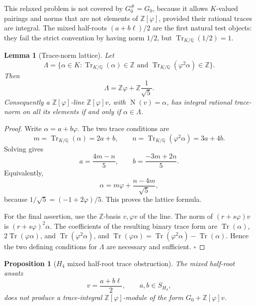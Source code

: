 \documentclass[12pt,oneside,english]{amsart}
\numberwithin{equation}{section}
\numberwithin{figure}{section}
\numberwithin{table}{section}
\theoremstyle{plain}
\newtheorem{proposition}[theorem]{Proposition}
\newtheorem{lemma}[theorem]{Lemma}
\theoremstyle{definition}
\theoremstyle{remark}
\newcommand{\ZZ}{\mathbb Z}
\newcommand{\QQ}{\mathbb Q}
\newcommand{\Zphi}{\mathbb Z[\varphi]}
\newcommand{\Tr}{\operatorname{Tr}}
\newcommand{\Norm}{\operatorname{N}}
\begin{document}
This relaxed problem is not covered by \(G_0^\#=G_0\), because it allows \(K\)-valued pairings and norms that are not elements of \(\Zphi\), provided their rational traces are integral. The mixed half-roots \((a+b\ell)/2\) are the first natural test objects: they fail the strict convention by having norm \(1/2\), but \(\Tr_{K/\QQ}(1/2)=1\).

\begin{lemma}[Trace-norm lattice]
Let
\begin{equation}
\Lambda=\{\alpha\in K:\Tr_{K/\QQ}(\alpha)\in\ZZ
\text{ and }\Tr_{K/\QQ}(\varphi^2\alpha)\in\ZZ\}.
\label{eq:trace-norm-lattice-definition}
\end{equation}
Then
\begin{equation}
\Lambda=\ZZ\varphi+\ZZ\frac{1}{\sqrt5}.
\label{eq:trace-norm-lattice}
\end{equation}
Consequently a \(\Zphi\)-line \(\Zphi v\), with \(\Norm(v)=\alpha\), has integral rational trace-norm on all its elements if and only if \(\alpha\in\Lambda\).
\end{lemma}

\begin{proof}
Write \(\alpha=a+b\varphi\). The two trace conditions are
\begin{equation}
m=\Tr_{K/\QQ}(\alpha)=2a+b,\qquad
n=\Tr_{K/\QQ}(\varphi^2\alpha)=3a+4b.
\label{eq:trace-norm-conditions}
\end{equation}
Solving gives
\begin{equation}
a=\frac{4m-n}{5},\qquad b=\frac{-3m+2n}{5}.
\label{eq:trace-norm-solution}
\end{equation}
Equivalently,
\begin{equation}
\alpha=m\varphi+\frac{n-4m}{\sqrt5},
\label{eq:trace-norm-generators}
\end{equation}
because \(1/\sqrt5=(-1+2\varphi)/5\). This proves the lattice formula.

For the final assertion, use the \(\ZZ\)-basis \(v,\varphi v\) of the line. The norm of \((r+s\varphi)v\) is \((r+s\varphi)^2\alpha\). The coefficients of the resulting binary trace form are \(\Tr(\alpha)\), \(2\Tr(\varphi\alpha)\), and \(\Tr(\varphi^2\alpha)\), and \(\Tr(\varphi\alpha)=\Tr(\varphi^2\alpha)-\Tr(\alpha)\). Hence the two defining conditions for \(\Lambda\) are necessary and sufficient. \(\square\)
\end{proof}

\begin{proposition}[\(H_4\) mixed half-root trace obstruction]
\label{prop:h4-mixed-trace}
The mixed half-root ansatz
\begin{equation}
v=\frac{a+b\ell}{2},\qquad a,b\in S_{H_4},
\end{equation}
does not produce a trace-integral \(\Zphi\)-module of the form \(G_0+\Zphi v\).
\end{proposition}
\end{document}
